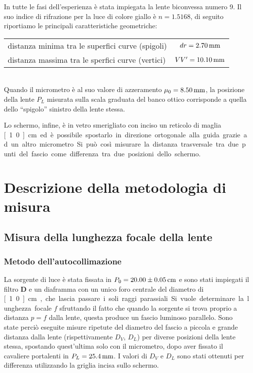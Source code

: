 \documentclass[italian,a4paper]{article}
\begin{document}
In tutte le fasi dell'esperienza è stata impiegata la lente biconvessa numero 9. Il suo indice di rifrazione per la luce di colore giallo è $n=1.5168$, di seguito riportiamo le principali caratteristiche geometriche:
\begin{table*}[h!]
\centering
 \begin{tabular}{lc}
distanza minima tra le superfici curve (spigoli)&	$dr=\unit[2.70]{mm}$\\
distanza massima tra le sperfici curve (vertici)&	$VV'=\unit[10.10]{mm}$
\end{tabular}
\end{table*}\\
Quando il micrometro è al suo valore di azzeramento $\mu_0=\unit[8.50]{mm}$, la posizione della lente $P_L$ misurata sulla scala graduata del banco ottico corrisponde a quella dello ``spigolo'' sinistro della lente stessa.

Lo schermo, infine, è in vetro smerigliato con inciso un reticolo di maglia \unit[1.0]{cm} ed è possibile spostarlo in direzione ortogonale alla guida grazie ad un altro micrometro. Si può così misurare la distanza trasversale tra due punti del fascio come differenza tra due posizioni dello schermo.
\section{Descrizione della metodologia di misura}
\subsection{Misura della lunghezza focale della lente}
\subsubsection*{Metodo dell'autocollimazione}
La sorgente di luce è stata fissata in $P_0=\unit[20.00 \pm 0.05]{cm}$ e sono stati impiegati il filtro \textbf{D} e un diaframma con un unico foro centrale del diametro di \unit[1.0]{cm}, che lascia passare i soli raggi parassiali. 

Si vuole determinare la lunghezza focale $f$ sfruttando il fatto che quando la sorgente si trova proprio a distanza $p=f$ dalla lente, questa produce un fascio luminoso parallelo. 
Sono state perciò eseguite misure ripetute del diametro del fascio a piccola e grande distanza dalla lente (rispettivamente $D_V$, $D_L$) per diverse posizioni della lente stessa, spostando quest'ultima solo con il micrometro, dopo aver fissato il cavaliere portalenti in $P_L=\unit[25.4]{mm}$. I valori di $D_V$ e $D_L$ sono stati ottenuti per differenza utilizzando la griglia incisa sullo schermo.
\end{document}
